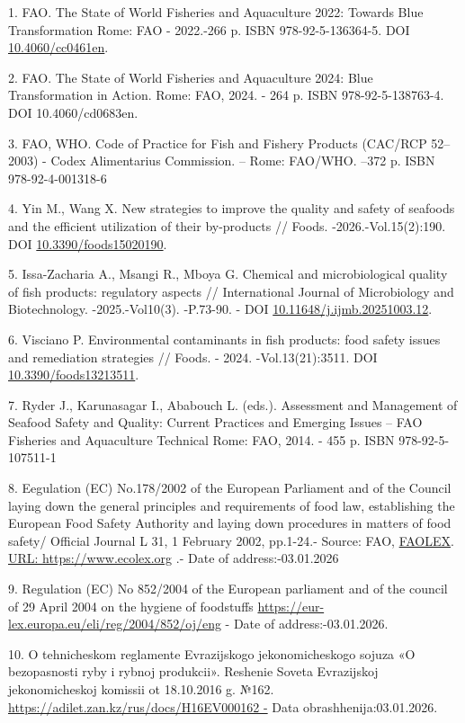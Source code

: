 \begin{refs}
1. FAO. The State of World Fisheries and Aquaculture 2022: Towards Blue
Transformation Rome: FAO - 2022.-266 p. ISBN 978-92-5-136364-5. DOI
\href{https://doi.org/10.4060/cc0461en}{10.4060/cc0461en}.

2. FAO. The State of World Fisheries and Aquaculture 2024: Blue
Transformation in Action. Rome: FAO, 2024. - 264 p. ISBN
978-92-5-138763-4. DOI 10.4060/cd0683en.

3. FAO, WHO. Code of Practice for Fish and Fishery Products (CAC/RCP
52--2003) - Codex Alimentarius Commission. -- Rome: FAO/WHO.
--372 p. ISBN 978-92-4-001318-6

4. Yin M., Wang X. New strategies to improve the quality and safety of
seafoods and the efficient utilization of their by-products // Foods.
-2026.-Vol.15(2):190. DOI
\href{https://doi.org/10.3390/foods15020190}{10.3390/foods15020190}.

5. Issa-Zacharia A., Msangi R., Mboya G. Chemical and microbiological
quality of fish products: regulatory aspects // International Journal of
Microbiology and Biotechnology. -2025.-Vol10(3). -P.73-90. - DOI
\href{https://doi.org/10.11648/j.ijmb.20251003.12}{10.11648/j.ijmb.20251003.12}.

6. Visciano P. Environmental contaminants in fish products: food safety
issues and remediation strategies // Foods. - 2024. -Vol.13(21):3511.
DOI \href{https://doi.org/10.3390/foods13213511}{10.3390/foods13213511}.

7. Ryder J., Karunasagar I., Ababouch L. (eds.). Assessment and
Management of Seafood Safety and Quality: Current Practices and Emerging
Issues -- FAO Fisheries and Aquaculture Technical Rome: FAO, 2014. - 455
p. ISBN 978-92-5-107511-1

8. Eegulation (EC) No.178/2002 of the European Parliament and of the
Council laying down the general principles and requirements of food law,
establishing the European Food Safety Authority and laying down
procedures in matters of food safety/ Official Journal L 31, 1 February
2002, pp.1-24.- Source:
FAO, \href{https://www.fao.org/faolex/results/details/en/c/LEX-FAOC034771}{FAOLEX}.
\href{https://www.ecolex.org/details/legislation/regulation-ec-no-1782002-of-the-european-parliament-and-of-the-council-laying-down-the-general-principles-and-requirements-of-food-law-establishing-the-european-food-safety-authority-and-laying-down-procedures-in-matters-of-food-safety-lex-faoc034771/?type=legislation&xsubjects=Energy&page=170}{URL: https://www.ecolex.org} .- Date of address:-03.01.2026

9. Regulation (EC) No 852/2004 of the European parliament and of the
council of 29 April 2004 on the hygiene of
foodstuffs \url{https://eur-lex.europa.eu/eli/reg/2004/852/oj/eng} -
Date of address:-03.01.2026.

10. O tehnicheskom reglamente Evrazijskogo jekonomicheskogo sojuza «O
bezopasnosti ryby i rybnoj produkcii». Reshenie Soveta Evrazijskoj
jekonomicheskoj komissii ot 18.10.2016 g. №162.
\href{https://adilet.zan.kz/rus/docs/H16EV000162\%20-}{https://adilet.zan.kz/rus/docs/H16EV000162
-} Data obrashhenija:03.01.2026.
\end{refs}

